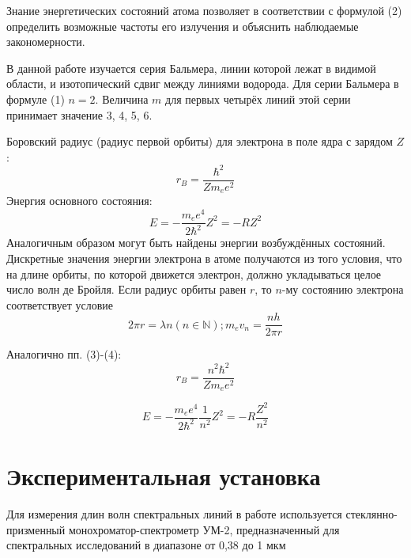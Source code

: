 \documentclass[a4paper]{article}
\begin{document}
Знание энергетических состояний атома позволяет в соответствии с формулой (2) определить возможные частоты его излучения и объяснить наблюдаемые закономерности. \par
В данной работе изучается серия Бальмера, линии которой лежат в видимой области, и изотопический сдвиг между линиями водорода. Для серии Бальмера в формуле (1) $n = 2$. Величина $m$ для первых четырёх линий этой серии принимает значение 3, 4, 5, 6. \par
Боровский радиус (радиус первой орбиты) для электрона в поле ядра с зарядом $Z$:
\begin{equation}
    r_B = \frac{\hbar^2}{Z m_e e^2}
\end{equation}
Энергия основного состояния:
\begin{equation}
    E = -\frac{m_e e^4}{2 \hbar^2}Z^2 = -R Z^2
\end{equation}
Аналогичным образом могут быть найдены энергии возбуждённых состояний. Дискретные значения энергии электрона в атоме получаются из того условия, что на длине орбиты, по которой движется электрон, должно укладываться целое число волн де Бройля. Если радиус орбиты равен $r$, то $n$-му состоянию электрона соответствует условие 
\begin{equation}
    2 \pi r = \lambda n (n \in \mathbb{N}) ; m_e v_n = \frac{nh}{2 \pi r}
\end{equation}

Аналогично пп. (3)-(4):
\begin{equation}
     r_B = \frac{n^2 \hbar^2}{Z m_e e^2}
\end{equation}

\begin{equation}
    E = -\frac{m_e e^4}{2 \hbar^2} \frac{1}{n^2} Z^2 = -R \frac{Z^2}{n^2}
\end{equation}

\section{Экспериментальная установка}
Для измерения длин волн спектральных линий в работе используется стеклянно-призменный монохроматор-спектрометр УМ-2, предназначенный для спектральных исследований в диапазоне от 0,38 до 1 мкм
\end{document}

